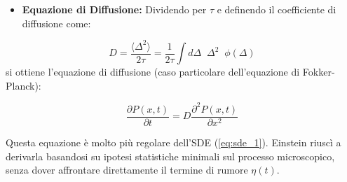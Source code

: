\begin{itemize}
$P(x-\Delta, t) \approx P(x,t) - \Delta \frac{\partial P}{\partial x}(x,t) + \frac{\Delta^2}{2} \frac{\partial^2 P}{\partial x^2}(x,t) + \dots$

Sostituendo nell'equazione (\ref{eq:eq_7}):
\begin{equation}
\begin{aligned}
P(x,t) + \tau \frac{\partial P}{\partial t} &\approx \int d\Delta \, \phi(\Delta) \left[ P(x,t) - \Delta \frac{\partial P}{\partial x} + \frac{\Delta^2}{2} \frac{\partial^2 P}{\partial x^2} \right] \\
&= P(x,t) \underbrace{\int d\Delta \; \; \phi(\Delta)}_{=1} - \frac{\partial P}{\partial x} \underbrace{\int d\Delta \; \; \Delta \; \;\phi(\Delta)}_{=\langle \Delta \rangle = 0} \\ &+ \frac{1}{2} \frac{\partial^2 P}{\partial x^2} \underbrace{\int d\Delta \; \; \Delta^2 \; \; \phi(\Delta)}_{=\langle \Delta^2 \rangle}
\end{aligned}
\end{equation}

Semplificando $P(x,t)$ e riarrangiando:
\begin{equation}
\tau \frac{\partial P}{\partial t} \approx \frac{\langle \Delta^2 \rangle}{2} \frac{\partial^2 P}{\partial x^2}
\end{equation}

\item \textbf{Equazione di Diffusione:} Dividendo per $\tau$ e definendo il coefficiente di diffusione come:
\end{itemize}
\begin{equation} 
D = \frac{\langle \Delta^2 \rangle}{2\tau} = \frac{1}{2\tau} \int d\Delta \; \; \Delta^2 \; \; \phi(\Delta) 
\end{equation}
si ottiene l’equazione di diffusione (caso particolare dell'equazione di Fokker-Planck):

\begin{tcolorbox}[colback=colorA!5,colframe=colorA, arc=3mm, boxrule=1.2pt]
\begin{equation}
\frac{\partial P(x,t)}{\partial t} = D \frac{\partial^2 P(x,t)}{\partial x^2}
\end{equation}
\end{tcolorbox}

Questa equazione è molto più regolare dell'SDE (\ref{eq:sde_1}). Einstein riuscì a derivarla basandosi su ipotesi statistiche minimali sul processo microscopico, senza dover affrontare direttamente il termine di rumore $\eta(t)$.

